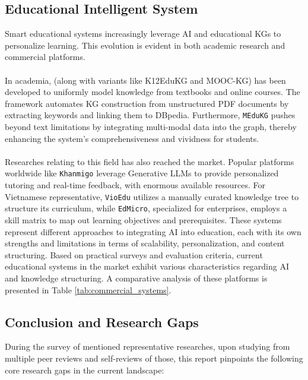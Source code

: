 \subsection{Educational Intelligent System}
Smart educational systems increasingly leverage AI and educational KGs to personalize learning. This evolution is evident in both academic research and commercial platforms. 
\\\\In academia, \cite{EduKG} (along with variants like K12EduKG and MOOC-KG) has been developed to uniformly model knowledge from textbooks and online courses. The \cite{EduKGPipeline} framework automates KG construction from unstructured PDF documents by extracting keywords and linking them to DBpedia. 
Furthermore, \texttt{MEduKG} pushes beyond text limitations by integrating multi-modal data into the graph, thereby enhancing the system's comprehensiveness and 
vividness for students.
\\\\
Researches relating to this field has also reached the market. Popular platforms worldwide like \texttt{Khanmigo} leverage 
Generative LLMs to provide personalized tutoring and real-time feedback, with enormous available resources.
For Vietnamese representative, \texttt{VioEdu} utilizes a manually curated knowledge tree to structure its curriculum, while 
\texttt{EdMicro}, specialized for enterprises, employs a skill matrix to map out learning objectives and prerequisites. 
 These systems represent different approaches to integrating AI into education, each with its own strengths and limitations in terms of scalability, personalization, and content structuring.
Based on practical surveys and evaluation criteria, current educational systems in the market exhibit various characteristics regarding AI and knowledge structuring. A comparative analysis of these platforms is presented in Table \ref{tab:commercial_systems}.



\subsection{Conclusion and Research Gaps}
During the survey of mentioned representative researches, upon studying from multiple peer reviews and self-reviews of those, this report pinpoints the following core research gaps in the current landscape:

